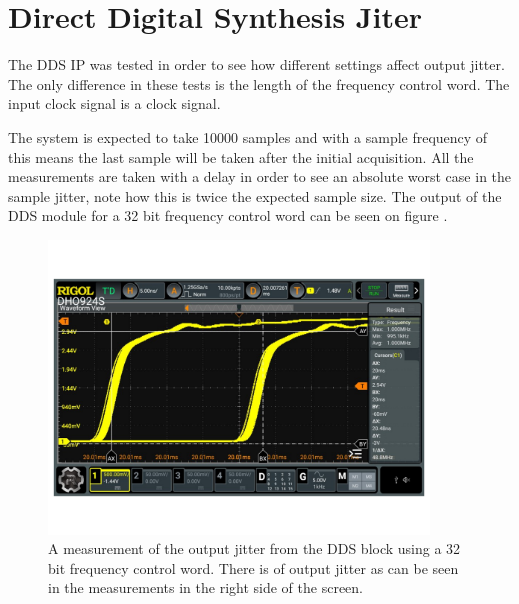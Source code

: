 \chapter{Direct Digital Synthesis Jiter} \label{App:DDSJitter}
The DDS IP was tested in order to see how different settings affect output jitter. The only difference in these tests is the length of the frequency control word. The input clock signal is a  clock signal.

The system is expected to take 10000 samples and with a sample frequency of  this means the last sample will be taken  after the initial acquisition. All the measurements are taken with a  delay in order to see an absolute worst case in the sample jitter, note how this is twice the expected sample size. The output of the DDS module for a 32 bit frequency control word can be seen on figure .

\begin{figure}[H]
    \centering
    \includegraphics[clip, trim=0 50 0 0, width=0.9\textwidth]{Appendix/Figures/A_DDS_JITTER_32BIT.pdf}
    \caption{A measurement of the output jitter from the DDS block using a 32 bit frequency control word. There is  of output jitter as can be seen in the measurements in the right side of the screen.}
    \label{fig:A_DDS_JITTER_32BIT}
\end{figure}

